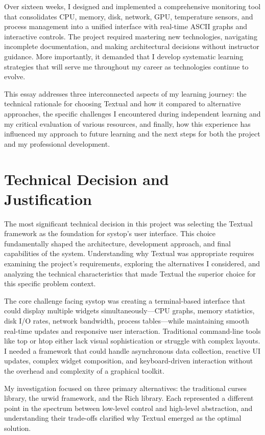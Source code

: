 \documentclass[12pt,a4paper]{article}
\begin{document}
Over sixteen weeks, I designed and implemented a comprehensive monitoring tool that consolidates CPU, memory, disk, network, GPU, temperature sensors, and process management into a unified interface with real-time ASCII graphs and interactive controls. The project required mastering new technologies, navigating incomplete documentation, and making architectural decisions without instructor guidance. More importantly, it demanded that I develop systematic learning strategies that will serve me throughout my career as technologies continue to evolve.

This essay addresses three interconnected aspects of my learning journey: the technical rationale for choosing Textual and how it compared to alternative approaches, the specific challenges I encountered during independent learning and my critical evaluation of various resources, and finally, how this experience has influenced my approach to future learning and the next steps for both the project and my professional development.

\section*{Technical Decision and Justification}

The most significant technical decision in this project was selecting the Textual framework as the foundation for systop's user interface. This choice fundamentally shaped the architecture, development approach, and final capabilities of the system. Understanding why Textual was appropriate requires examining the project's requirements, exploring the alternatives I considered, and analyzing the technical characteristics that made Textual the superior choice for this specific problem context.

The core challenge facing systop was creating a terminal-based interface that could display multiple widgets simultaneously—CPU graphs, memory statistics, disk I/O rates, network bandwidth, process tables—while maintaining smooth real-time updates and responsive user interaction. Traditional command-line tools like top or htop either lack visual sophistication or struggle with complex layouts. I needed a framework that could handle asynchronous data collection, reactive UI updates, complex widget composition, and keyboard-driven interaction without the overhead and complexity of a graphical toolkit.

My investigation focused on three primary alternatives: the traditional curses library, the urwid framework, and the Rich library. Each represented a different point in the spectrum between low-level control and high-level abstraction, and understanding their trade-offs clarified why Textual emerged as the optimal solution.
\end{document}
